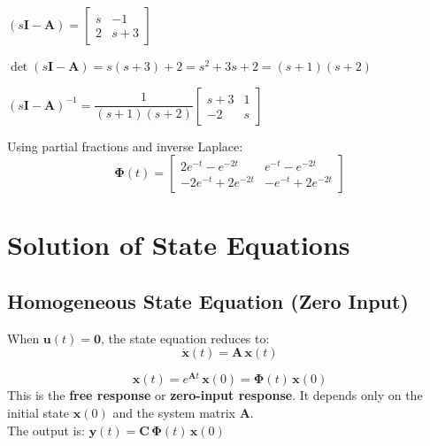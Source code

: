 \documentclass[12pt,a4paper]{article}
\begin{document}
\begin{tcolorbox}[examplebox, title={Example: Compute STM for $\mathbf{A} = \begin{bmatrix}0&1\\-2&-3\end{bmatrix}$}]
$(s\mathbf{I}-\mathbf{A}) = \begin{bmatrix}s&-1\\2&s+3\end{bmatrix}$

$\det(s\mathbf{I}-\mathbf{A}) = s(s+3)+2 = s^2+3s+2 = (s+1)(s+2)$

$(s\mathbf{I}-\mathbf{A})^{-1} = \dfrac{1}{(s+1)(s+2)}\begin{bmatrix}s+3&1\\-2&s\end{bmatrix}$

Using partial fractions and inverse Laplace:
$$\boldsymbol{\Phi}(t) = \begin{bmatrix}2e^{-t}-e^{-2t} & e^{-t}-e^{-2t}\\-2e^{-t}+2e^{-2t} & -e^{-t}+2e^{-2t}\end{bmatrix}$$
\end{tcolorbox}

\section{Solution of State Equations}

\subsection{Homogeneous State Equation (Zero Input)}

When $\mathbf{u}(t) = \mathbf{0}$, the state equation reduces to:
$$\dot{\mathbf{x}}(t) = \mathbf{A}\,\mathbf{x}(t)$$

\begin{tcolorbox}[formulabox, title={Solution --- Homogeneous (Zero Input)}]
$$\boxed{\mathbf{x}(t) = e^{\mathbf{A}t}\,\mathbf{x}(0) = \boldsymbol{\Phi}(t)\,\mathbf{x}(0)}$$
This is the \textbf{free response} or \textbf{zero-input response}. It depends only on the initial state $\mathbf{x}(0)$ and the system matrix $\mathbf{A}$.\\[4pt]
The output is: $\mathbf{y}(t) = \mathbf{C}\,\boldsymbol{\Phi}(t)\,\mathbf{x}(0)$
\end{tcolorbox}
\end{document}

